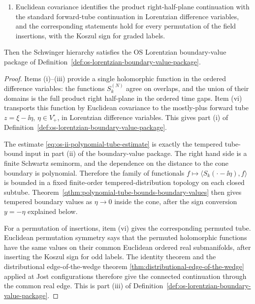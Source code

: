 \begin{proposition}
\begin{enumerate}[label=(\roman*)]
\begin{equation}
  \sup_\xi |\xi^\beta\partial^\alpha f(\xi)|
  \label{eq:os-ii-polynomial-tube-estimate}
\end{equation}
for all Schwartz tests \(f\) in the reduced difference variables.
\item Euclidean covariance identifies the product right-half-plane
continuation with the standard forward-tube continuation in Lorentzian
difference variables, and the corresponding statements hold for every
permutation of the field insertions, with the Koszul sign for graded labels.
\end{enumerate}
Then the Schwinger hierarchy satisfies the OS Lorentzian boundary-value package
of Definition~\ref{def:os-lorentzian-boundary-value-package}.
\end{proposition}

\begin{proof}
Items (i)--(iii) provide a single holomorphic function in the ordered
difference variables: the functions \(S_k^{(N)}\) agree on overlaps, and the
union of their domains is the full product right half-plane in the ordered
time gaps.  Item (vi) transports this function by Euclidean covariance to the
mostly-plus forward tube \(z=\xi-\ii\eta\), \(\eta\in V_+^\circ\), in
Lorentzian difference variables.  This gives part (i) of
Definition~\ref{def:os-lorentzian-boundary-value-package}.

The estimate \eqref{eq:os-ii-polynomial-tube-estimate} is exactly the
tempered tube-bound input in part (ii) of the boundary-value package.  The
right hand side is a finite Schwartz seminorm, and the dependence on the
distance to the cone boundary is polynomial.  Therefore the family of
functionals \(f\mapsto\langle S_k(\cdot-\ii\eta),f\rangle\) is bounded in a
fixed finite-order tempered-distribution topology on each closed subtube.
Theorem~\ref{qthm:polynomial-tube-bounds-boundary-values} then gives
tempered boundary values as \(\eta\to0\) inside the cone, after the sign
conversion \(y=-\eta\) explained below.

For a permutation of insertions, item (vi) gives the corresponding permuted
tube.  Euclidean permutation symmetry says that the permuted holomorphic
functions have the same values on their common Euclidean ordered real
submanifolds, after inserting the Koszul sign for odd labels.  The identity
theorem and the distributional edge-of-the-wedge theorem
\ref{thm:distributional-edge-of-the-wedge} applied at Jost configurations
therefore give the connected continuation through the common real edge.  This
is part (iii) of Definition~\ref{def:os-lorentzian-boundary-value-package}.
\end{proof}

